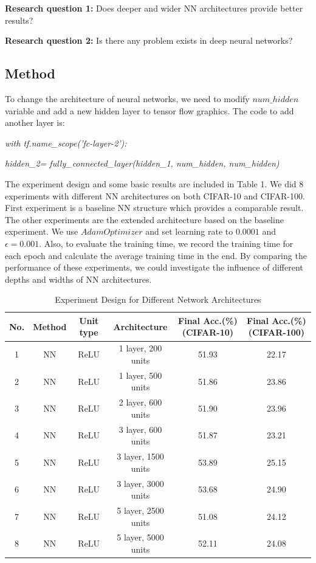 \documentclass[]{article}
\begin{document}
\textbf{Research question 1:} Does deeper and wider NN architectures provide better results?

\textbf{Research question 2:} Is there any problem exists in deep neural networks?
\subsection{Method}
To change the architecture of neural networks, we need to modify $num\_hidden$ variable and add a new hidden layer to tensor flow graphics. The code to add another layer is:

\emph{with tf.name\_scope('fc-layer-2'):} 

\emph{\qquad hidden\_2= fully\_connected\_layer(hidden\_1, num\_hidden, num\_hidden)}

The experiment design and some basic results are included in Table 1. We did 8 experiments with different NN architectures on both CIFAR-10 and CIFAR-100. First experiment is a baseline NN structure which provides a comparable result. The other experiments are the extended architecture based on the baseline experiment. We use $AdamOptimizer$ and set learning rate to $0.0001$ and $\epsilon = 0.001$. Also, to evaluate the training time, we record the training time for each epoch and calculate the average training time in the end. By comparing the performance of these experiments, we could investigate the influence of different depths and widths of NN architectures.
 
\begin{table}[ht]
\centering 
\caption{Experiment Design for Different Network Architectures}
\begin{tabular}{c c c c c c}
\toprule
No. & Method & Unit type & Architecture & Final Acc.(\%)(CIFAR-10) & Final Acc.(\%)(CIFAR-100) \\
\midrule
1 & NN & ReLU & 1 layer, 200 units & 51.93 & 22.17 \\
2 & NN & ReLU & 1 layer, 500 units & 51.86 & 23.86  \\
3 & NN & ReLU & 2 layer, 600 units & 51.90 & 23.96  \\
4 & NN & ReLU & 3 layer, 600 units & 51.87 & 23.21  \\
5 & NN & ReLU & 3 layer, 1500 units & 53.89 & 25.15  \\
6 & NN & ReLU & 3 layer, 3000 units & 53.68 & 24.90 \\
7 & NN & ReLU & 5 layer, 2500 units & 51.08 & 24.12  \\
8 & NN & ReLU & 5 layer, 5000 units & 52.11 & 24.08  \\
\bottomrule
\end{tabular}
\end{table} 
\end{document}
